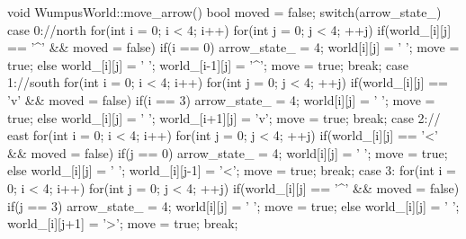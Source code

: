 \begin{answercode}
void WumpusWorld::move_arrow()
{
    bool moved = false;
    switch(arrow_state_)
    {
        case 0://north
        for(int i = 0; i < 4; i++)
        {
            for(int j = 0; j < 4; ++j)
            {
                if(world_[i][j] == '^' && moved = false)
                {
                    if(i == 0)
                    {
                        arrow_state_ = 4;
                        world[i][j] = ' ';
                        move = true;
                    }
                    else
                    {
                        world_[i][j] = ' ';
                        world_[i-1][j] = '^';
                        move = true;
                    }
                }
            }
        }
        break;
        case 1://south
        for(int i = 0; i < 4; i++)
        {
            for(int j = 0; j < 4; ++j)
            {
                if(world_[i][j] == 'v' && moved = false)
                {
                    if(i == 3)
                    {
                        arrow_state_ = 4;
                        world[i][j] = ' ';
                        move = true;
                    }
                    else
                    {
                        world_[i][j] = ' ';
                        world_[i+1][j] = 'v';
                        move = true;
                    }
                }
            }
        }
        break;
        case 2:// east
        for(int i = 0; i < 4; i++)
        {
            for(int j = 0; j < 4; ++j)
            {
                if(world_[i][j] == '<' && moved = false)
                {
                    if(j == 0)
                    {
                        arrow_state_ = 4;
                        world[i][j] = ' ';
                        move = true;
                    }
                    else
                    {
                        world_[i][j] = ' ';
                        world_[i][j-1] = '<';
                        move = true;
                    }
                }
            }
        }
        break;
        case 3:
        for(int i = 0; i < 4; i++)
        {
            for(int j = 0; j < 4; ++j)
            {
                if(world_[i][j] == '^' && moved = false)
                {
                    if(j == 3)
                    {
                        arrow_state_ = 4;
                        world[i][j] = ' ';
                        move = true;
                    }
                    else
                    {
                        world_[i][j] = ' ';
                        world_[i][j+1] = '>';
                        move = true;
                    }
                }
            }
        }
        break;
    }
}

\end{answercode}


\newpage


